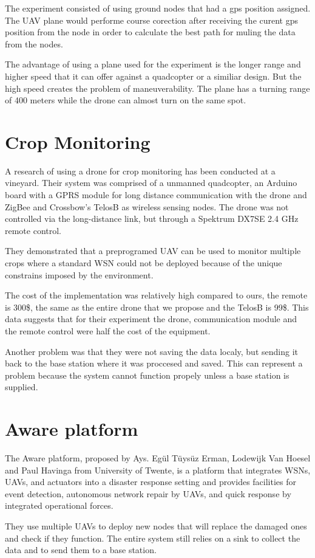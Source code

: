 The experiment consisted of using ground nodes that had a gps position assigned. The UAV plane would performe course corection after receiving the curent gps position from the node in order to calculate the best path for muling the data from the nodes.

The advantage of using a plane used for the experiment is the longer range and higher speed that it can offer against a quadcopter or a similiar design.  But the high speed creates the problem of maneuverability. The plane has a turning range of 400 meters while the drone can almost turn on the same spot.

\section{Crop Monitoring} \cite{valente2011air}

A research of using a drone for crop monitoring has been conducted at a vineyard. Their system was comprised of a unmanned quadcopter, an Arduino board with a GPRS module for long distance communication with  the drone and ZigBee and Crossbow’s TelosB as wireless sensing nodes. The drone was not controlled via the long-distance link, but through a Spektrum DX7SE 2.4 GHz remote control.

They demonstrated that a preprogramed UAV can be used to monitor multiple crops where a standard WSN could not be deployed because of the unique constrains imposed by the environment.

The cost of the implementation was relatively high compared to ours, the remote is 300\$, the same as the entire drone that we propose and the TelosB is 99\$. This data suggests that for their experiment the drone, communication module and the remote control were half the cost of the equipment.

Another problem was that they were not saving the data localy, but sending it back to the base station where it was proccesed and saved. This can represent a problem because the system cannot function propely unless a base station is supplied.

\section{Aware platform}\cite{ollero2007aware}

The Aware platform, proposed by Ays. Egül Tüysüz Erman, Lodewijk Van Hoesel and Paul Havinga from University of Twente, is a platform that integrates WSNs, UAVs, and actuators into a disaster response setting and provides facilities for event detection, autonomous network repair by UAVs, and quick response by integrated operational forces.

They use multiple UAVs to deploy new nodes that will replace the damaged ones and check if they function. The entire system still relies on a sink to collect the data and to send them to a base station.\cite{erman2008enabling}
